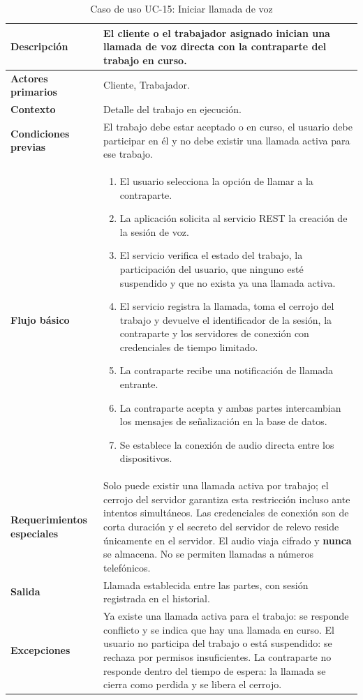 \documentclass[doc,12pt,a4paper]{apa7}
\begin{document}
\begin{longtable}{|P{3.3cm}|L{11.2cm}|}
\caption{Caso de uso UC-15: Iniciar llamada de voz}\\
\hline
\textbf{Descripción} & El cliente o el trabajador asignado inician una llamada de voz directa con la contraparte del trabajo en curso. \\ \hline
\textbf{Actores primarios} & Cliente, Trabajador. \\ \hline
\textbf{Contexto} & Detalle del trabajo en ejecución. \\ \hline
\textbf{Condiciones previas} & El trabajo debe estar aceptado o en curso, el usuario debe participar en él y no debe existir una llamada activa para ese trabajo. \\ \hline
\textbf{Flujo básico} &
\begin{enumerate}
    \item El usuario selecciona la opción de llamar a la contraparte.
    \item La aplicación solicita al servicio REST la creación de la sesión de voz.
    \item El servicio verifica el estado del trabajo, la participación del usuario, que ninguno esté suspendido y que no exista ya una llamada activa.
    \item El servicio registra la llamada, toma el cerrojo del trabajo y devuelve el identificador de la sesión, la contraparte y los servidores de conexión con credenciales de tiempo limitado.
    \item La contraparte recibe una notificación de llamada entrante.
    \item La contraparte acepta y ambas partes intercambian los mensajes de señalización en la base de datos.
    \item Se establece la conexión de audio directa entre los dispositivos.
\end{enumerate} \\ \hline
\textbf{Requerimientos especiales} & Solo puede existir una llamada activa por trabajo; el cerrojo del servidor garantiza esta restricción incluso ante intentos simultáneos. Las credenciales de conexión son de corta duración y el secreto del servidor de relevo reside únicamente en el servidor. El audio viaja cifrado y \textbf{nunca} se almacena. No se permiten llamadas a números telefónicos. \\ \hline
\textbf{Salida} & Llamada establecida entre las partes, con sesión registrada en el historial. \\ \hline
\textbf{Excepciones} & Ya existe una llamada activa para el trabajo: se responde conflicto y se indica que hay una llamada en curso. El usuario no participa del trabajo o está suspendido: se rechaza por permisos insuficientes. La contraparte no responde dentro del tiempo de espera: la llamada se cierra como perdida y se libera el cerrojo. \\ \hline
\end{longtable}
\end{document}

